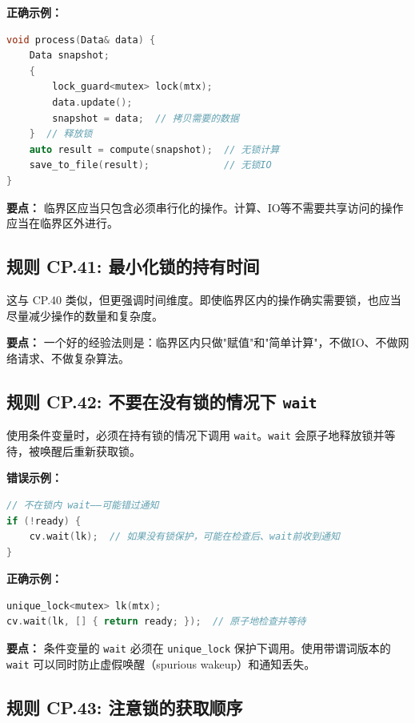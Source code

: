 \textbf{正确示例：}

\begin{lstlisting}[language=C++]
void process(Data& data) {
    Data snapshot;
    {
        lock_guard<mutex> lock(mtx);
        data.update();
        snapshot = data;  // 拷贝需要的数据
    }  // 释放锁
    auto result = compute(snapshot);  // 无锁计算
    save_to_file(result);             // 无锁IO
}
\end{lstlisting}

\textbf{要点：} 临界区应当只包含必须串行化的操作。计算、IO等不需要共享访问的操作应当在临界区外进行。

\subsection*{\textbf{规则 CP.41:} 最小化锁的持有时间}

这与 CP.40 类似，但更强调时间维度。即使临界区内的操作确实需要锁，也应当尽量减少操作的数量和复杂度。

\textbf{要点：} 一个好的经验法则是：临界区内只做"赋值"和"简单计算"，不做IO、不做网络请求、不做复杂算法。

\subsection*{\textbf{规则 CP.42:} 不要在没有锁的情况下 \texttt{wait}}

使用条件变量时，必须在持有锁的情况下调用 \texttt{wait}。\texttt{wait} 会原子地释放锁并等待，被唤醒后重新获取锁。

\textbf{错误示例：}

\begin{lstlisting}[language=C++]
// 不在锁内 wait——可能错过通知
if (!ready) {
    cv.wait(lk);  // 如果没有锁保护，可能在检查后、wait前收到通知
}
\end{lstlisting}

\textbf{正确示例：}

\begin{lstlisting}[language=C++]
unique_lock<mutex> lk(mtx);
cv.wait(lk, [] { return ready; });  // 原子地检查并等待
\end{lstlisting}

\textbf{要点：} 条件变量的 \texttt{wait} 必须在 \texttt{unique\_lock} 保护下调用。使用带谓词版本的 \texttt{wait} 可以同时防止虚假唤醒（spurious wakeup）和通知丢失。

\subsection*{\textbf{规则 CP.43:} 注意锁的获取顺序}

